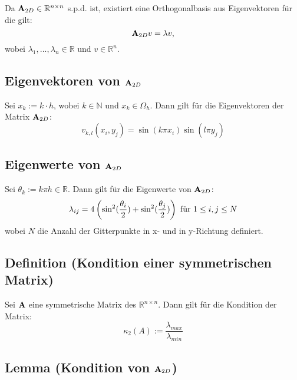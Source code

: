 Da ${\textbf{A}}_{2D} \in \mathbb{R}^{n \times n}$ s.p.d. ist, existiert eine Orthogonalbasis aus Eigenvektoren für die gilt:
\begin{equation}
{\textbf{A}}_{2D}v = \lambda v,
\end{equation}
wobei $\lambda_{1},...,\lambda_{n} \in \mathbb{R}$ und $v \in \mathbb{R}^{n}$.

\subsection{Eigenvektoren von ${\textbf{A}}_{2D}$}\label{ss.Eigenvektoren}

Sei $x_{k} := k \cdot h$, wobei $k \in \mathbb{N}$ und $x_{k} \in \Omega_{h}$. Dann gilt für die Eigenvektoren der Matrix ${\textbf{A}}_{2D}$:
\begin{equation}
v_{k,l}(x_{i},y_{j}) = \sin(k \pi x_{i}) \sin(l \pi y_{j})
\end{equation}

\subsection{Eigenwerte von ${\textbf{A}}_{2D}$}\label{ss.Eigenwerte}

Sei $\theta_{k} := k \pi h \in \mathbb{R}$. Dann gilt für die Eigenwerte von ${\textbf{A}}_{2D}$:
\begin{equation}
\lambda_{ij} = 4 \left(\sin^{2}(\frac {\theta_{i}} {2}) + \sin^{2}(\frac {\theta_{j}} {2}) \right) \textnormal{ für } 1 \le i,j \le N\label{eq.Eigenwerte}
\end{equation}
wobei $N$ die Anzahl der Gitterpunkte in x- und in y-Richtung definiert.

\subsection{Definition (Kondition einer symmetrischen Matrix)}\label{ss.Definition Kondition einer Matrix}

Sei ${\textbf{A}}$ eine symmetrische Matrix des $\mathbb{R}^{n \times n}$. Dann gilt für die Kondition der Matrix:
\begin{equation}
\kappa_{2} (A) := \frac {\lambda_{max}} {\lambda_{min}}\label{eq.Kondition}
\end{equation}

\subsection{Lemma (Kondition von ${\textbf{A}}_{2D}$)}\label{ss.Matrixkondition}

